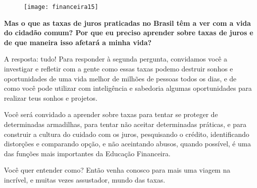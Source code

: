\begin{figure}[H]
\centering

\texttt{[image: financeira15]}
\end{figure}


\textbf{Mas o que as taxas de juros praticadas no Brasil têm a ver com a vida do cidadão comum? Por que eu preciso aprender sobre taxas de juros e de que maneira isso afetará a minha vida?}

A resposta: tudo! Para responder à segunda pergunta, convidamos você a investigar e refletir com a gente como essas taxas podemo destruir sonhos e oportunidades de uma vida melhor de milhões de pessoas todos os dias, e de como você pode utilizar com inteligência e sabedoria algumas oportunidades para realizar teus sonhos e projetos.

Você será convidado a aprender sobre taxas para tentar se proteger de determinadas armadilhas, para tentar não aceitar determinadas práticas, e para construir a cultura do cuidado com os juros, pesquisando o crédito, identificando distorções e comparando opção, e não aceintando abusos, quando possível, é uma das funções mais importantes da Educação Financeira.

Você quer entender como? Então venha conosco para mais uma viagem na incrível, e muitas vezes assustador, mundo das taxas.

